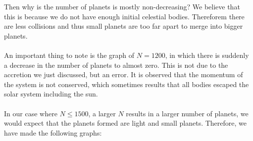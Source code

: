 Then why is the number of planets is mostly non-decreasing? We believe that this is because we do not have enough initial celestial bodies. Thereforem there are less collisions and thus small planets are too far apart to merge into bigger planets.\\
\\
An important thing to note is the graph of $N=1200$, in which there is suddenly a decrease in the number of planets to almost zero. This is not due to the accretion we just discussed, but an error. It is observed that the momentum of the system is not conserved, which sometimes results that all bodies escaped the solar system including the sun.\\
\\
In our case where $N\leq 1500$, a larger $N$ results in a larger number of planets, we would expect that the planets formed are light and small planets. Therefore, we have made the following graphs:
